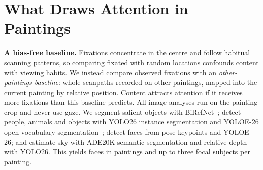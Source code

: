 \documentclass[10pt,twocolumn,letterpaper]{article}
\newcommand{\mypara}[1]{\vspace{2pt}\noindent\textbf{#1}\hspace{0.5em}}
\begin{document}
\begin{table}[t]
  \centering
  \caption{Spatial scanpath measures, intra vs inter pairs. $r_{rb}$: rank-biserial effect size; \% img.: paintings where
  intra pairs are more similar; $q$: BH-corrected.}
  \label{tab:scanpath}
\end{table}

\begin{table}[t]
  \centering
  \caption{Image-encoder scanpath measures: AUC of intra vs inter pairs (all $q<10^{-3}$). Bold: best per column.}
  \label{tab:encoders}
\end{table}

\section{What Draws Attention in Paintings}
\label{sec:content}

\mypara{A bias-free baseline.} Fixations concentrate in the centre and follow habitual scanning patterns, so comparing
fixated with random locations confounds content with viewing habits. We instead compare observed fixations with an
\emph{other-paintings baseline}: whole scanpaths recorded on other paintings, mapped into the current painting by
relative position. Content attracts attention if it receives more fixations than this baseline predicts. All image
analyses run on the painting crop and never use gaze. We segment salient objects with BiRefNet~\cite{zheng2024birefnet};
detect people, animals and objects with YOLO26 instance segmentation and YOLOE-26 open-vocabulary
segmentation~\cite{ultralytics,wang2025yoloe}; detect faces from pose keypoints and YOLOE-26; and estimate sky with
ADE20K semantic segmentation and relative depth with YOLO26. This yields \nFaces{} faces in \nPaintingsFaces{}
paintings and up to three focal subjects per painting.
\end{document}
